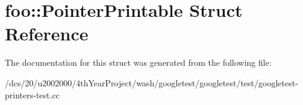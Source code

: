 \hypertarget{structfoo_1_1PointerPrintable}{}\section{foo\+:\+:Pointer\+Printable Struct Reference}
\label{structfoo_1_1PointerPrintable}


The documentation for this struct was generated from the following file\+:\begin{DoxyCompactItemize}
\item 
/dcs/20/u2002000/4th\+Year\+Project/wash/googletest/googletest/test/googletest-\/printers-\/test.\+cc\end{DoxyCompactItemize}
